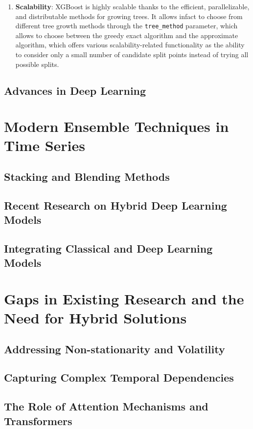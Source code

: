 \begin{enumerate}
    \item \textbf{Scalability}: XGBoost is highly scalable thanks to the efficient, parallelizable, and distributable methods for growing trees. It allows infact to choose from different tree growth methods through the \texttt{tree\_method} parameter, which allows to choose between the greedy exact algorithm and the approximate algorithm, which offers various scalability-related functionality as the ability to consider only a small number of candidate split points instead of trying all possible splits. 
        
\end{enumerate} 


\subsection{Advances in Deep Learning} %

\section{Modern Ensemble Techniques in Time Series} %
\label{Sec: ensemble learning}

\subsection{Stacking and Blending Methods} %

\subsection{Recent Research on Hybrid Deep Learning Models} %

\subsection{Integrating Classical and Deep Learning Models} %

\section{Gaps in Existing Research and the Need for Hybrid Solutions} %
\subsection{Addressing Non-stationarity and Volatility} %

\subsection{Capturing Complex Temporal Dependencies} %

\subsection{The Role of Attention Mechanisms and Transformers} %
